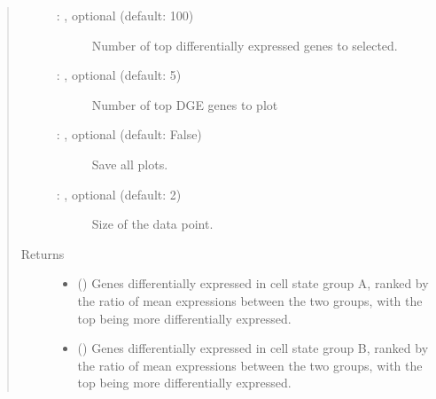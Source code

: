 \documentclass[letterpaper,10pt,english]{sphinxmanual}
\begin{document}
\begin{fulllineitems}
\begin{quote}
\begin{description}
\begin{description}
\item[{ : , optional (default: 100)}] \leavevmode
Number of top differentially expressed genes to selected.

\item[{ : , optional (default: 5)}] \leavevmode
Number of top DGE genes to plot

\item[{ : , optional (default: False)}] \leavevmode
Save all plots.

\item[{ : , optional (default: 2)}] \leavevmode
Size of the data point.

\end{description}

\item[{Returns}] \leavevmode
\begin{itemize}
\item {} 
 () \textendash{} Genes differentially expressed in cell state group A, ranked
by the ratio of mean expressions between
the two groups, with the top being more differentially expressed.

\item {} 
 () \textendash{} Genes differentially expressed in cell state group B, ranked
by the ratio of mean expressions between
the two groups, with the top being more differentially expressed.

\end{itemize}


\end{description}\end{quote}

\end{fulllineitems}


\end{document}
